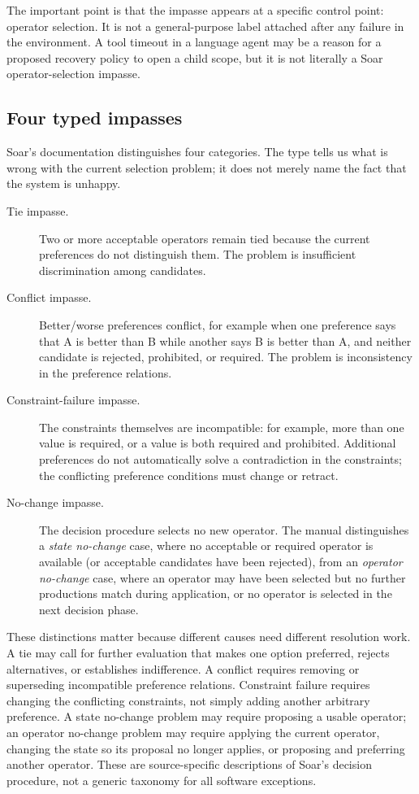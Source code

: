 The important point is that the impasse appears at a specific control point: operator selection. It is not a general-purpose label attached after any failure in the environment. A tool timeout in a language agent may be a reason for a proposed recovery policy to open a child scope, but it is not literally a Soar operator-selection impasse.

\subsection{Four typed impasses}
\label{subsec:ch13-impasse-types}

Soar's documentation distinguishes four categories. The type tells us what is wrong with the current selection problem; it does not merely name the fact that the system is unhappy.\autocite{soar2025architecture}

\begin{description}
  \item[Tie impasse.] Two or more acceptable operators remain tied because the current preferences do not distinguish them. The problem is insufficient discrimination among candidates.
  \item[Conflict impasse.] Better/worse preferences conflict, for example when one preference says that A is better than B while another says B is better than A, and neither candidate is rejected, prohibited, or required. The problem is inconsistency in the preference relations.
  \item[Constraint-failure impasse.] The constraints themselves are incompatible: for example, more than one value is required, or a value is both required and prohibited. Additional preferences do not automatically solve a contradiction in the constraints; the conflicting preference conditions must change or retract.
  \item[No-change impasse.] The decision procedure selects no new operator. The manual distinguishes a \emph{state no-change} case, where no acceptable or required operator is available (or acceptable candidates have been rejected), from an \emph{operator no-change} case, where an operator may have been selected but no further productions match during application, or no operator is selected in the next decision phase.
\end{description}

These distinctions matter because different causes need different resolution work. A tie may call for further evaluation that makes one option preferred, rejects alternatives, or establishes indifference. A conflict requires removing or superseding incompatible preference relations. Constraint failure requires changing the conflicting constraints, not simply adding another arbitrary preference. A state no-change problem may require proposing a usable operator; an operator no-change problem may require applying the current operator, changing the state so its proposal no longer applies, or proposing and preferring another operator. These are source-specific descriptions of Soar's decision procedure, not a generic taxonomy for all software exceptions.\autocite{soar2025architecture}


